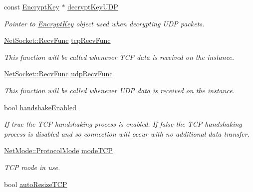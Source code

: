 \begin{DoxyCompactItemize}
const \hyperlink{class_encrypt_key}{EncryptKey} $\ast$ \hyperlink{class_net_instance_profile_a0909a6a77030a97700cef25384df37b0}{decryptKeyUDP}
\begin{DoxyCompactList}\small\item\em Pointer to \hyperlink{class_encrypt_key}{EncryptKey} object used when decrypting UDP packets. \item\end{DoxyCompactList}\item 
\hyperlink{class_net_socket_a52b5f4de8d0a47fd8620f542b21c076c}{NetSocket::RecvFunc} \hyperlink{class_net_instance_profile_a879b3034d521919570637748adefb6d8}{tcpRecvFunc}
\begin{DoxyCompactList}\small\item\em This function will be called whenever TCP data is received on the instance. \item\end{DoxyCompactList}\item 
\hyperlink{class_net_socket_a52b5f4de8d0a47fd8620f542b21c076c}{NetSocket::RecvFunc} \hyperlink{class_net_instance_profile_a2825db403a006e006f4f0b6b4b50c0bb}{udpRecvFunc}
\begin{DoxyCompactList}\small\item\em This function will be called whenever UDP data is received on the instance. \item\end{DoxyCompactList}\item 
bool \hyperlink{class_net_instance_profile_aaeba0fb41f3972711b0d789d13d74c0f}{handshakeEnabled}
\begin{DoxyCompactList}\small\item\em If true the TCP handshaking process is enabled. If false the TCP handshaking process is disabled and so connection will occur with no additional data transfer. \item\end{DoxyCompactList}\item 
\hyperlink{class_net_mode_a43cfa55ee6a4db66a8d7d6c27f766964}{NetMode::ProtocolMode} \hyperlink{class_net_instance_profile_acfc65e0440c83e5e5fa35f3480d8db3e}{modeTCP}
\begin{DoxyCompactList}\small\item\em TCP mode in use. \item\end{DoxyCompactList}\item 
bool \hyperlink{class_net_instance_profile_a9c10389be76ce558cdaad5e5847d7d96}{autoResizeTCP}

\end{DoxyCompactItemize}
